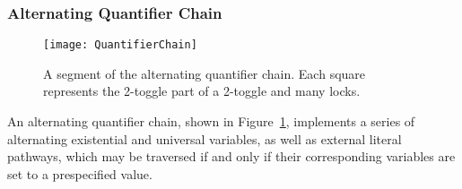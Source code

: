 
\subsubsection{Alternating Quantifier Chain}
\begin{figure}[h!]
\centering
    \texttt{[image: QuantifierChain]}
    \caption{A segment of the alternating quantifier chain. Each square represents the 2-toggle part of a 2-toggle and many locks.}
    \label{fig:QuantifierChain}
\end{figure}

An alternating quantifier chain, shown in Figure~\ref{fig:QuantifierChain}, implements a series of
alternating existential and universal variables, as well as external literal pathways, which may be traversed
if and only if their corresponding variables are set to a prespecified value.

